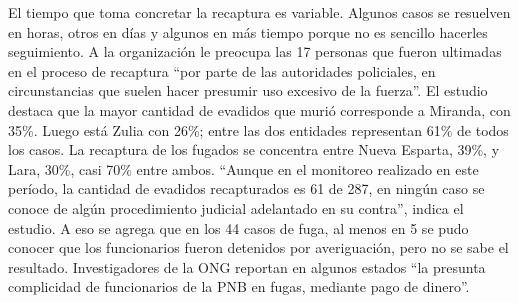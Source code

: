 \documentclass{article}%
\begin{document}
\newline%
%
El tiempo que toma concretar la recaptura es variable. Algunos casos se resuelven en horas, otros en días y algunos en más tiempo porque no es sencillo hacerles seguimiento.%
\newline%
%
A la organización le preocupa las 17 personas que fueron ultimadas en el proceso de recaptura “por parte de las autoridades policiales, en circunstancias que suelen hacer presumir uso excesivo de la fuerza”.%
\newline%
%
El estudio destaca que la mayor cantidad de evadidos que murió corresponde a Miranda, con 35\%. Luego está Zulia con 26\%; entre las dos entidades representan 61\% de todos los casos.%
\newline%
%
La recaptura de los fugados se concentra entre Nueva Esparta, 39\%, y Lara, 30\%, casi 70\% entre ambos.%
\newline%
%
“Aunque en el monitoreo realizado en este período, la cantidad de evadidos recapturados es 61 de 287, en ningún caso se conoce de algún procedimiento judicial adelantado en su contra”, indica el estudio.%
\newline%
%
A eso se agrega que en los 44 casos de fuga, al menos en 5 se pudo conocer que los funcionarios fueron detenidos por averiguación, pero no se sabe el resultado.%
\newline%
%
Investigadores de la ONG reportan en algunos estados “la presunta complicidad de funcionarios de la PNB en fugas, mediante pago de dinero”.%
\newline%
%
\end{document}
